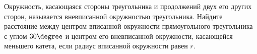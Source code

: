 \begin{ex}
	\begin{condition}
		Окружность, касающаяся стороны треугольника и продолжений двух его других сторон, называется вневписанной окружностью треугольника.
		Найдите расстояние между центром вписанной окружности прямоугольного треугольника с углом \( 30\degree \) и центром его вневписанной окружности, касающейся меньшего катета, если радиус вписанной окружности равен \( r \).
	\end{condition}
\end{ex}